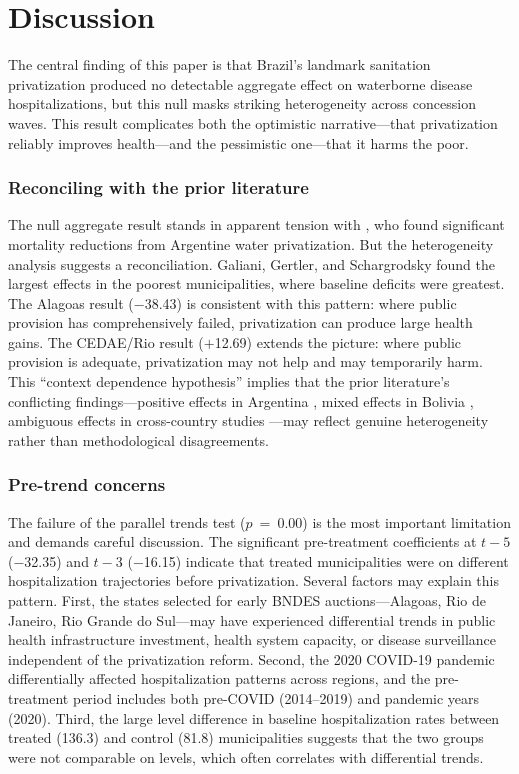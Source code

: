 \documentclass[12pt]{article}
\begin{document}
\section{Discussion}
\label{sec:discussion}

The central finding of this paper is that Brazil's landmark sanitation privatization produced no detectable aggregate effect on waterborne disease hospitalizations, but this null masks striking heterogeneity across concession waves. This result complicates both the optimistic narrative---that privatization reliably improves health---and the pessimistic one---that it harms the poor.

\subsubsection*{Reconciling with the prior literature} The null aggregate result stands in apparent tension with \citet{galiani2005water}, who found significant mortality reductions from Argentine water privatization. But the heterogeneity analysis suggests a reconciliation. Galiani, Gertler, and Schargrodsky found the largest effects in the poorest municipalities, where baseline deficits were greatest. The Alagoas result ($-$38.43) is consistent with this pattern: where public provision has comprehensively failed, privatization can produce large health gains. The CEDAE/Rio result ($+$12.69) extends the picture: where public provision is adequate, privatization may not help and may temporarily harm. This ``context dependence hypothesis'' implies that the prior literature's conflicting findings---positive effects in Argentina \citep{galiani2005water}, mixed effects in Bolivia \citep{davis2008privatization}, ambiguous effects in cross-country studies \citep{estache2005infrastructure}---may reflect genuine heterogeneity rather than methodological disagreements.

\subsubsection*{Pre-trend concerns} The failure of the parallel trends test ($p$~=~0.00) is the most important limitation and demands careful discussion. The significant pre-treatment coefficients at $t-5$ ($-$32.35) and $t-3$ ($-$16.15) indicate that treated municipalities were on different hospitalization trajectories before privatization. Several factors may explain this pattern. First, the states selected for early BNDES auctions---Alagoas, Rio de Janeiro, Rio Grande do Sul---may have experienced differential trends in public health infrastructure investment, health system capacity, or disease surveillance independent of the privatization reform. Second, the 2020 COVID-19 pandemic differentially affected hospitalization patterns across regions, and the pre-treatment period includes both pre-COVID (2014--2019) and pandemic years (2020). Third, the large level difference in baseline hospitalization rates between treated (136.3) and control (81.8) municipalities suggests that the two groups were not comparable on levels, which often correlates with differential trends.
\end{document}
